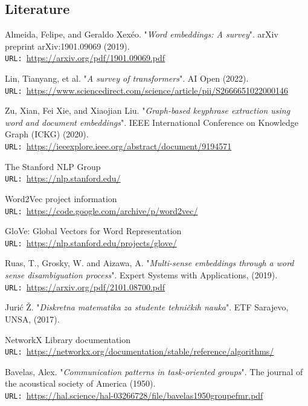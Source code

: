 \documentclass[12pt]{article}
\numberwithin{equation}{section}
\begin{document}
\begin{spacing}{1.5}
	\newpage
	\section{Literature}
	
	\begin{thebibliography}{8}
		Almeida, Felipe, and Geraldo Xexéo. "\textit{Word embeddings: A survey}". arXiv preprint arXiv:1901.09069 (2019). \\
		\texttt{URL: }\url{https://arxiv.org/pdf/1901.09069.pdf}
		
		Lin, Tianyang, et al. "\textit{A survey of transformers}". AI Open (2022).\\
		\texttt{URL: }\url{https://www.sciencedirect.com/science/article/pii/S2666651022000146}
		
		Zu, Xian, Fei Xie, and Xiaojian Liu. "\textit{Graph-based keyphrase extraction using word and document embeddings}". IEEE International Conference on Knowledge Graph (ICKG) (2020). \\
		\texttt{URL: }\url{https://ieeexplore.ieee.org/abstract/document/9194571}
		
		The Stanford NLP Group\\
		\texttt{URL: }\url{https://nlp.stanford.edu/}
		
		Word2Vec project information\\
		\texttt{URL: }\url{https://code.google.com/archive/p/word2vec/}
		
		GloVe: Global Vectors for Word Representation\\
		\texttt{URL: }\url{https://nlp.stanford.edu/projects/glove/}
		
		Ruas, T., Grosky, W. and Aizawa, A.  "\textit{Multi-sense embeddings through a word sense disambiguation process}". Expert Systems with Applications,  (2019). \\
		\texttt{URL: }\url{https://arxiv.org/pdf/2101.08700.pdf}
		
		Jurić Ž. "\textit{Diskretna matematika za studente tehničkih nauka}". ETF Sarajevo, UNSA, (2017). 
		
		NetworkX Library documentation\\
		\texttt{URL: }\url{https://networkx.org/documentation/stable/reference/algorithms/}
		
		Bavelas, Alex. "\textit{Communication patterns in task‐oriented groups}". The journal of the acoustical society of America (1950). \\
		\texttt{URL: }\url{https://hal.science/hal-03266728/file/bavelas1950groupefmr.pdf}
		

\end{thebibliography}
\end{spacing}
\end{document}
